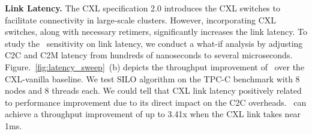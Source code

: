 {%

\noindent \textbf{Link Latency.}
The CXL specification 2.0 introduces the CXL switches to facilitate connectivity in large-scale clusters. However, incorporating CXL switches, along with necessary retimers, significantly increases the link latency. 
To study the \name~sensitivity on link latency, we conduct a what-if analysis by adjusting C2C and C2M latency from hundreds of nanoseconds to several microseconds. 
Figure.~\ref{fig:latency_sweep}~(b) depicts the throughput improvement of \name~over the CXL-vanilla baseline. We test SILO algorithm on the TPC-C benchmark with 8 nodes and 8 threads each. We could tell that CXL link latency positively related to performance improvement due to its direct impact on the C2C overheads. \name~can achieve a throughput improvement of up to 3.41x when the CXL link takes near 1ms. 


}
